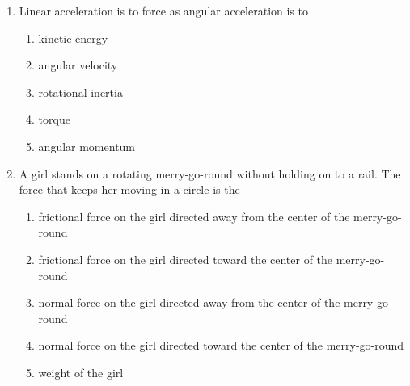 \documentclass{../../oss-apphys}
\begin{document}
\genheader


\genmultidirections

\gengravity

\raggedcolumns
\begin{multicols}{2}
  \begin{enumerate}[leftmargin=18pt]

  \item Linear acceleration is to force as angular acceleration is to
    \begin{enumerate}[noitemsep,topsep=0pt,leftmargin=18pt,label=(\Alph*)]
    \item kinetic energy
    \item angular velocity
    \item rotational inertia
    \item torque
    \item angular momentum
    \end{enumerate}

  \item A girl stands on a rotating merry-go-round without holding on to a rail.
    The force that keeps her moving in a circle is the
    \begin{enumerate}[noitemsep,topsep=0pt,leftmargin=18pt,label=(\Alph*)]
    \item frictional force on the girl directed away from the center of the
      merry-go-round
    \item frictional force on the girl directed toward the center of the
      merry-go-round
    \item normal force on the girl directed away from the center of the
      merry-go-round
    \item normal force on the girl directed toward the center of the
      merry-go-round
    \item weight of the girl
    \end{enumerate}

    

\end{enumerate}
\end{multicols}
\end{document}
